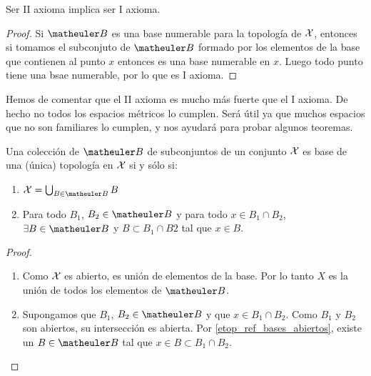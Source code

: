 \begin{obs}
	Ser II axioma implica ser I axioma.
\end{obs}
\begin{proof}
	Si $\B$ es una base numerable para la topología de $\mathcal{X}$, entonces si tomamos el subconjuto de $\B$ formado por los elementos de la base que contienen al punto $x$ entonces es una base numerable en $x$. Luego todo punto tiene una bsae numerable, por lo que es I axioma.
\end{proof}
Hemos de comentar que el II axioma es mucho más fuerte que el I axioma. De hecho no todos los espacios métricos lo cumplen. Será útil ya que muchos espacios que no son familiares lo cumplen, y nos ayudará para probar algunos teoremas.
\begin{prop}
	\label{etop_base_top}
	Una colección de $\B$ de subconjuntos de un conjunto $\mathcal{X}$ es base de una (única) topología en $\mathcal{X}$ si y sólo si:
	\begin{enumerate}
		\item $\X = \bigcup_{B \in \B}B$
		\item Para todo $B_1$, $B_2 \in \B$ y para todo $x \in B_1 \cap B_2$,  $\exists B \in \B$  y  $B \subset B_1 \cap B2$ tal que $x \in B$.
	\end{enumerate}
\begin{proof}
	\begin{enumerate}
		\item Como $\mathcal{X}$ es abierto, es unión de elementos de la base. Por lo tanto $X$ es la unión de todos los elementos de $\B$.
		\item Supongamos que $B_1$, $B_2 \in \B$ y que $x \in B_1 \cap B_2$. Como $B_1$ y $B_2$ son abiertos, su intersección es abierta. Por \ref{etop_ref_bases_abiertos}, existe un $B \in \B$ tal que $x \in B \subset B_1 \cap B_2$.
	\end{enumerate}
\end{proof}
\end{prop}

